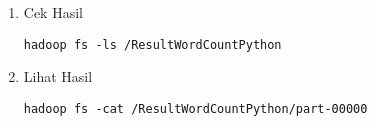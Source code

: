 \documentclass[a4paper]{tufte-handout}
\begin{document}
\begin{enumerate}
\item Cek Hasil
\begin{lstlisting}[language=Terminal]
 hadoop fs -ls /ResultWordCountPython
\end{lstlisting}

\item Lihat Hasil 
\begin{lstlisting}[language=Terminal]
 hadoop fs -cat /ResultWordCountPython/part-00000
\end{lstlisting}

\end{enumerate}

\hrulefill

\clearpage
{}
\end{document}
